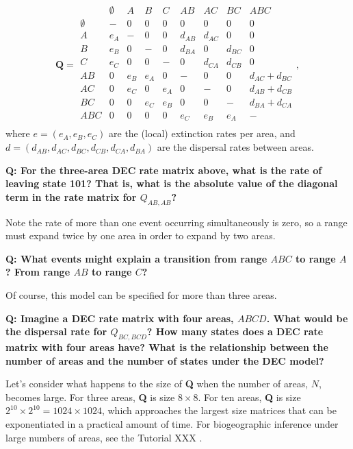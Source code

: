 \[
\textbf{Q} = 
	\begin{array}{c|cccccccc}
		& \emptyset & A & B & C & AB & AC & BC & ABC \\
		\hline
		\emptyset & - & 0 & 0 & 0 & 0 & 0 & 0 & 0 \\
		A & e_A & - & 0 & 0 & d_{AB} & d_{AC} & 0 & 0 \\
		B & e_B & 0 & - & 0 & d_{BA} & 0 & d_{BC} & 0 \\
		C & e_C & 0 & 0 & - & 0 & d_{CA} & d_{CB} & 0 \\
		AB & 0 & e_B & e_A & 0 & - & 0 & 0 & d_{AC} + d_{BC} \\
		AC & 0 & e_C & 0 & e_A & 0 & - & 0 & d_{AB} + d_{CB} \\
		BC & 0 & 0 & e_C & e_B & 0 & 0 & - & d_{BA} + d_{CA} \\
		ABC & 0 & 0 & 0 & 0 & e_C & e_B & e_A & - \\								
	\end{array},
\]
where $e = ( e_A, e_B, e_C )$ are the (local) extinction rates per area, and $d = ( d_{AB}, d_{AC}, d_{BC}, d_{CB}, d_{CA}, d_{BA})$ are the dispersal rates between areas.

{\bf Q: For the three-area DEC rate matrix above, what is the rate of leaving state 101? That is, what is the absolute value of the diagonal term in the rate matrix for $Q_{AB,AB}$? }

Note the rate of more than one event occurring simultaneously is zero, so a range must expand twice by one area in order to expand by two areas.

{\bf Q: What events might explain a transition from range $ABC$ to range $A$? From range $AB$ to range $C$?}

Of course, this model can be specified for more than three areas.

{ \bf Q: Imagine a DEC rate matrix with four areas, $ABCD$. What would be the dispersal rate for $Q_{BC,BCD}$? How many states does a DEC rate matrix with four areas have? What is the relationship between the number of areas and the number of states under the DEC model? }

Let's consider what happens to the size of \textbf{Q} when the number of areas, $N$, becomes large.
For three areas, \textbf{Q} is size $8 \times 8$.
For ten areas, \textbf{Q} is size $2^{10} \times 2^{10} = 1024 \times 1024$, which approaches the largest size matrices that can be exponentiated in a practical amount of time.
For biogeographic inference under large numbers of areas, see the Tutorial XXX \citep{landis13}.


